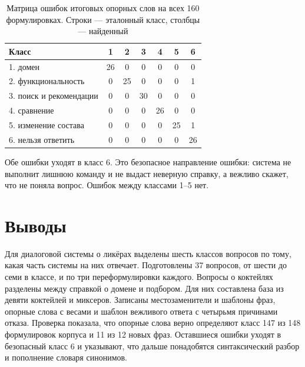 \begin{table}[H]
	\centering
	\caption{Матрица ошибок итоговых опорных слов на всех 160 формулировках. Строки --- эталонный класс, столбцы --- найденный}
	\label{tab:lr5_confusion}
	\footnotesize
	\begin{tabular}{|l|c|c|c|c|c|c|}
		\hline
		Класс & 1 & 2 & 3 & 4 & 5 & 6 \\ \hline
		1. домен & 26 & 0 & 0 & 0 & 0 & 0 \\ \hline
		2. функцио\-нальность & 0 & 25 & 0 & 0 & 0 & 1 \\ \hline
		3. поиск и рекомендации & 0 & 0 & 30 & 0 & 0 & 0 \\ \hline
		4. сравнение & 0 & 0 & 0 & 26 & 0 & 0 \\ \hline
		5. изменение состава & 0 & 0 & 0 & 0 & 25 & 1 \\ \hline
		6. нельзя ответить & 0 & 0 & 0 & 0 & 0 & 26 \\ \hline
	\end{tabular}
\end{table}

Обе ошибки уходят в класс 6. Это безопасное направление ошибки: система не выполнит лишнюю команду и не выдаст неверную справку, а вежливо скажет, что не поняла вопрос. Ошибок между классами 1--5 нет.

\section*{Выводы}

Для диалоговой системы о ликёрах выделены шесть классов вопросов по тому, какая часть системы на них отвечает. Подготовлены 37 вопросов, от шести до семи в классе, и по три переформулировки каждого. Вопросы о коктейлях разделены между справкой о домене и подбором. Для них составлена база из девяти коктейлей и миксеров. Записаны местозаменители и шаблоны фраз, опорные слова с весами и шаблон вежливого ответа с четырьмя причинами отказа. Проверка показала, что опорные слова верно определяют класс 147 из 148 формулировок корпуса и 11 из 12 новых фраз. Оставшиеся ошибки уходят в безопасный класс 6 и указывают, что дальше понадобятся синтаксический разбор и пополнение словаря синонимов.
